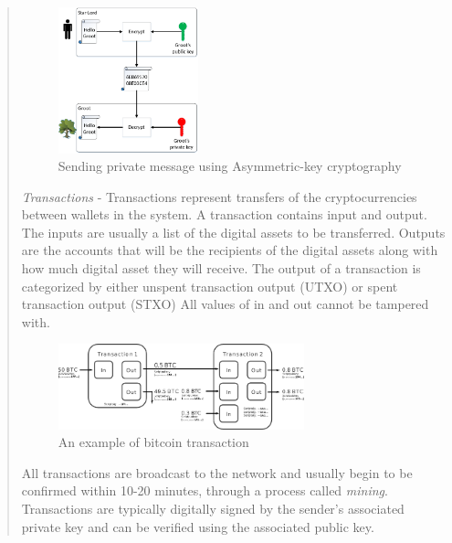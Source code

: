 \begin{itemize}
\begin{quote}
	\begin{figure}[h!]
		\centering
		\includegraphics[width=0.4\textwidth]{images/asymmetric_cryptography.png}
		\caption[An example of concept of Asymmetric-key cryptography]{Sending private message using Asymmetric-key cryptography}
		\label{fig:asymmetric_cryptography}
	\end{figure}
	\bigbreak

	\emph{Transactions} - Transactions represent transfers of the cryptocurrencies between wallets in the system. 
	A transaction contains input and output. The inputs are usually a list of the digital assets to be transferred.
	Outputs are	the accounts that will be the recipients of the digital assets along with how much digital asset they will receive.   
	The  output  of  a  transaction  is categorized  by  either  unspent  transaction  output  (UTXO)  or spent  transaction  output  (STXO)
	All values of in and out cannot be tampered with.

	\begin{figure}[h!]
		\centering
		\includegraphics[width=0.7\textwidth]{images/transaction.png}
		\caption[An example of bitcoin transaction]{An example of bitcoin transaction}
		\label{fig:transaction}
	\end{figure}
	\bigbreak

	All transactions are broadcast to the network and usually begin to be confirmed within 10-20 minutes, through a process called \emph{mining}.
	Transactions are typically digitally signed by the sender’s associated private key and can be verified using the associated public key.

	\bigbreak


\end{quote}
\end{itemize}
